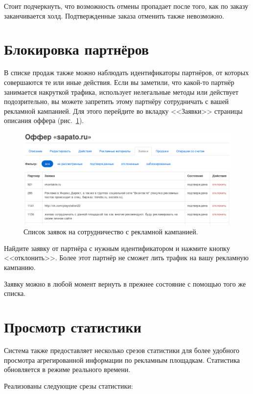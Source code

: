 \documentclass[a4paper,12pt]{article}
\begin{document}
Стоит подчеркнуть, что возможность отмены пропадает после того, как по заказу заканчивается холд. Подтвержденные заказа отменить также невозможно.

\section{Блокировка партнёров}

В списке продаж также можно наблюдать идентификаторы партнёров, от которых совершаются те или иные действия. Если вы заметили, что какой-то партнёр занимается накруткой трафика, использует нелегальные методы или действует подозрительно, вы можете запретить этому партнёру сотрудничать с вашей рекламной кампанией. Для этого перейдите во вкладку <<Заявки>> страницы описания оффера (рис.~\ref{fig:requests}).

\begin{figure}[!ht]
\centering
\includegraphics[width=\textwidth]{include/requests.png}
\caption{Список заявок на сотрудничество с рекламной кампанией.}
\label{fig:requests}
\end{figure}

Найдите заявку от партнёра с нужным идентификатором и нажмите кнопку <<отклонить>>. Более этот партнёр не сможет лить трафик на вашу рекламную кампанию.

Заявку можно в любой момент вернуть в прежнее состояние с помощью того же списка.

\section{Просмотр статистики}

Система \heymoose{} также предоставляет несколько срезов статистики для более удобного просмотра агрегированной информации по рекламным площадкам. Статистика обновляется в режиме реального времени.

Реализованы следующие срезы статистики:
\end{document}
